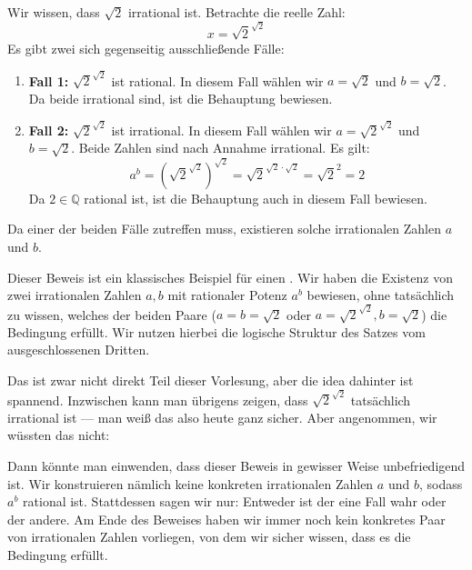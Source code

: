 \begin{math-stroke}

\begin{short-proof}
Wir wissen, dass $\sqrt{2}$ irrational ist. Betrachte die reelle Zahl:
\[ x = \sqrt{2}^{\sqrt{2}} \]
Es gibt zwei sich gegenseitig ausschließende Fälle:
\begin{enumerate}[label=\textbf{(\arabic*)}]
    \item \textbf{Fall 1:} $\sqrt{2}^{\sqrt{2}}$ ist rational. In diesem Fall wählen wir $a = \sqrt{2}$ und $b = \sqrt{2}$. Da beide irrational sind, ist die Behauptung bewiesen.
    \item \textbf{Fall 2:} $\sqrt{2}^{\sqrt{2}}$ ist irrational. In diesem Fall wählen wir $a = \sqrt{2}^{\sqrt{2}}$ und $b = \sqrt{2}$. Beide Zahlen sind nach Annahme irrational. Es gilt:
    \[ a^b = \left(\sqrt{2}^{\sqrt{2}}\right)^{\sqrt{2}} = \sqrt{2}^{\sqrt{2} \cdot \sqrt{2}} = \sqrt{2}^2 = 2 \]
    Da $2 \in \mathbb{Q}$ rational ist, ist die Behauptung auch in diesem Fall bewiesen.
\end{enumerate}
Da einer der beiden Fälle zutreffen muss, existieren solche irrationalen Zahlen $a$ und $b$.
\end{short-proof}

\begin{explanation-of-steps}
Dieser Beweis ist ein klassisches Beispiel für einen . Wir haben die Existenz von zwei irrationalen Zahlen $a, b$ mit rationaler Potenz $a^b$ bewiesen, ohne tatsächlich zu wissen, welches der beiden Paare ($a=b=\sqrt{2}$ oder $a=\sqrt{2}^{\sqrt{2}}, b=\sqrt{2}$) die Bedingung erfüllt. Wir nutzen hierbei die logische Struktur des Satzes vom ausgeschlossenen Dritten.
\end{explanation-of-steps}
\end{math-stroke}

\begin{spoken-clean}[00:01:08 - 00:02:25]
Das ist zwar nicht direkt Teil dieser Vorlesung, aber die idea dahinter ist spannend. Inzwischen kann man übrigens zeigen, dass $\sqrt{2}^{\sqrt{2}}$ tatsächlich irrational ist --- man weiß das also heute ganz sicher. Aber angenommen, wir wüssten das nicht:

Dann könnte man einwenden, dass dieser Beweis in gewisser Weise unbefriedigend ist. Wir konstruieren nämlich keine konkreten irrationalen Zahlen $a$ und $b$, sodass $a^b$ rational ist. Stattdessen sagen wir nur: Entweder ist der eine Fall wahr oder der andere. Am Ende des Beweises haben wir immer noch kein konkretes Paar von irrationalen Zahlen vorliegen, von dem wir sicher wissen, dass es die Bedingung erfüllt.
\end{spoken-clean}

